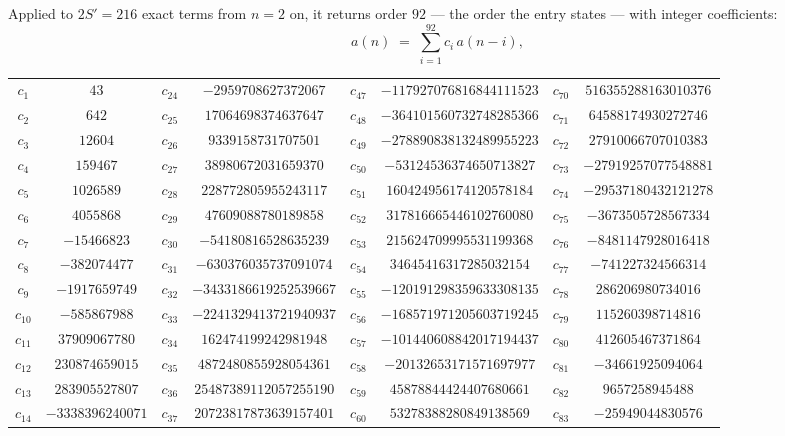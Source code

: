 \documentclass[11pt,a4paper]{article}
\theoremstyle{plain}
\theoremstyle{definition}
\begin{document}
Applied to $2S'=216$ exact terms from $n=2$ on, it returns order $92$ --- the
order the entry states --- with integer coefficients:
\[
a(n)\;=\;\sum_{i=1}^{92}c_i\,a(n-i),
\]
\begin{center}\small
\begin{tabular}{cccccccc}
$c_{1}$ & $43$ & $c_{24}$ & $-2959708627372067$ & $c_{47}$ & $-117927076816844111523$ & $c_{70}$ & $516355288163010376$ \\
$c_{2}$ & $642$ & $c_{25}$ & $17064698374637647$ & $c_{48}$ & $-364101560732748285366$ & $c_{71}$ & $64588174930272746$ \\
$c_{3}$ & $12604$ & $c_{26}$ & $9339158731707501$ & $c_{49}$ & $-278890838132489955223$ & $c_{72}$ & $27910066707010383$ \\
$c_{4}$ & $159467$ & $c_{27}$ & $38980672031659370$ & $c_{50}$ & $-53124536374650713827$ & $c_{73}$ & $-27919257077548881$ \\
$c_{5}$ & $1026589$ & $c_{28}$ & $228772805955243117$ & $c_{51}$ & $160424956174120578184$ & $c_{74}$ & $-29537180432121278$ \\
$c_{6}$ & $4055868$ & $c_{29}$ & $47609088780189858$ & $c_{52}$ & $317816665446102760080$ & $c_{75}$ & $-3673505728567334$ \\
$c_{7}$ & $-15466823$ & $c_{30}$ & $-54180816528635239$ & $c_{53}$ & $215624709995531199368$ & $c_{76}$ & $-8481147928016418$ \\
$c_{8}$ & $-382074477$ & $c_{31}$ & $-630376035737091074$ & $c_{54}$ & $34645416317285032154$ & $c_{77}$ & $-741227324566314$ \\
$c_{9}$ & $-1917659749$ & $c_{32}$ & $-3433186619252539667$ & $c_{55}$ & $-120191298359633308135$ & $c_{78}$ & $286206980734016$ \\
$c_{10}$ & $-585867988$ & $c_{33}$ & $-2241329413721940937$ & $c_{56}$ & $-168571971205603719245$ & $c_{79}$ & $115260398714816$ \\
$c_{11}$ & $37909067780$ & $c_{34}$ & $162474199242981948$ & $c_{57}$ & $-101440608842017194437$ & $c_{80}$ & $412605467371864$ \\
$c_{12}$ & $230874659015$ & $c_{35}$ & $4872480855928054361$ & $c_{58}$ & $-20132653171571697977$ & $c_{81}$ & $-34661925094064$ \\
$c_{13}$ & $283905527807$ & $c_{36}$ & $25487389112057255190$ & $c_{59}$ & $45878844424407680661$ & $c_{82}$ & $9657258945488$ \\
$c_{14}$ & $-3338396240071$ & $c_{37}$ & $20723817873639157401$ & $c_{60}$ & $53278388280849138569$ & $c_{83}$ & $-25949044830576$ \\

\end{tabular}
\end{center}
\end{document}
